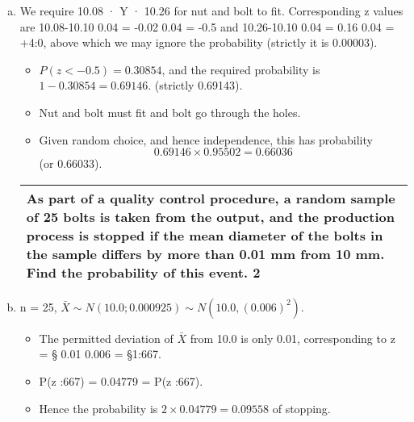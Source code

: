 \documentclass[a4paper,12pt]{article}
\begin{document}
\begin{enumerate}[(a)]
\begin{eqnarray}
i.e. &=& P(z > \frac{-0.24}{0.12} ) \\
&=& P(z > -2:0) \\ 
&=& 0.97725.
\end{eqnarray}
(a) Plates are independent, so required probability is (0.97725)2 = 0.95502.
\item We require 10.08 · Y · 10.26 for nut and bolt to fit. Corresponding z values
are 10.08-10.10
0.04 = -0.02
0.04 = -0.5 and 10.26-10.10
0.04 = 0.16
0.04 = +4:0, above which we
may ignore the probability (strictly it is 0.00003). 
\begin{itemize}
\item $P(z < -0.5) = 0.30854$,
and the required probability is $1 - 0.30854 = 0.69146.$ (strictly 0.69143).
\item Nut and bolt must fit and bolt go through the holes.
\item Given random choice,
and hence independence, this has probability \[0.69146 \times 0.95502 = 0.66036\]
(or 0.66033).
\end{itemize}

  \begin{table}[ht!]
     \centering
     \begin{tabular}{|p{15cm}|}
     \hline  
 As part of a quality control procedure, a random sample of 25 bolts is taken from the output, and the production process is stopped if the mean diameter of the bolts in the sample differs by more than 0.01 mm from 10 mm.  Find the probability of this event.
2\\ \hline
      \end{tabular}
    \end{table}

\item n = 25, $\bar{X} \sim N(10.0; 0.0009
25 ) \sim N(10.0, (0.006)^2)$.
\begin{itemize}
\item The permitted deviation of $\bar{X}$ from 10.0 is only 0.01, corresponding to
z = § 0.01
0.006 = §1:667.
\item P(z :667) = 0.04779 = P(z :667).
\item Hence the probability is $2 \times 0.04779 = 0.09558$ of stopping.
\end{itemize}
\end{enumerate}
\end{document}
